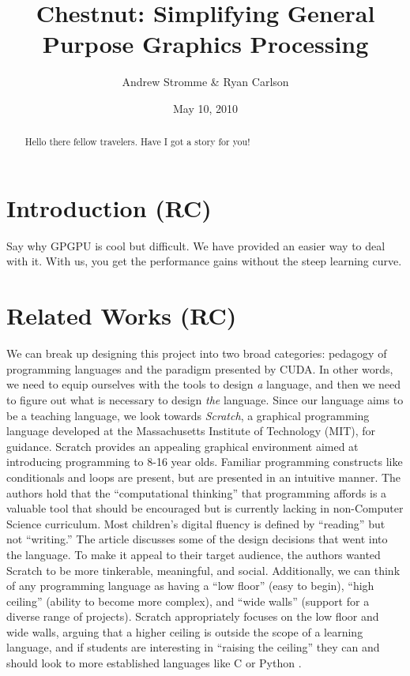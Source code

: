 \documentclass[twocolumn]{article}
\renewcommand{\|}{\origbar} %
\begin{document}
\title{Chestnut: Simplifying General Purpose Graphics Processing}
\author{Andrew Stromme \& Ryan Carlson}
\date{May 10, 2010}
\maketitle

\begin{abstract}
  Hello there fellow travelers. Have I got a story for you!
\end{abstract}

\section{Introduction (RC)}

Say why GPGPU is cool but difficult. We have provided an easier way to deal with it. With us, you get the performance gains without the steep learning curve.

\section{Related Works (RC)}


We can break up designing this project into two broad categories: pedagogy of programming languages and the paradigm presented by CUDA. In other words, we need to equip ourselves with the tools to design {\em a} language, and then we need to figure out what is necessary to design {\em the} language. Since our language aims to be a teaching language, we look towards {\em Scratch}, a graphical programming language developed at the Massachusetts Institute of Technology (MIT), for guidance. Scratch provides an appealing graphical environment aimed at introducing programming to 8-16 year olds. Familiar programming constructs like conditionals and loops are present, but are presented in an intuitive manner. The authors hold that the ``computational thinking'' that programming affords is a valuable tool that should be encouraged but is currently lacking in non-Computer Science curriculum. Most children's digital fluency is defined by ``reading'' but not ``writing.'' The article discusses some of the design decisions that went into the language. To make it appeal to their target audience, the authors wanted Scratch to be more tinkerable, meaningful, and social. Additionally, we can think of any programming language as having a ``low floor'' (easy to begin), ``high ceiling'' (ability to become more complex), and ``wide walls'' (support for a diverse range of projects). Scratch appropriately focuses on the low floor and wide walls, arguing that a higher ceiling is outside the scope of a learning language, and if students are interesting in ``raising the ceiling'' they can and should look to more established languages like C or Python \cite{resnick}.
\end{document}
